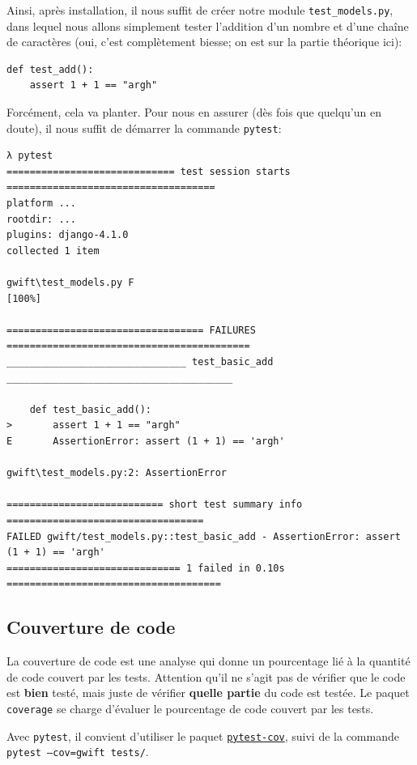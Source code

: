 \documentclass[11pt]{amsbook}
\begin{document}
Ainsi, après installation, il nous suffit de créer notre module \texttt{test\_models.py}, dans lequel nous allons simplement tester l’addition d’un nombre et d’une chaîne de caractères (oui, c’est complètement biesse; on est sur la partie théorique ici):


\begin{verbatim}
def test_add():
    assert 1 + 1 == "argh"
\end{verbatim}

Forcément, cela va planter.
Pour nous en assurer (dès fois que quelqu’un en doute), il nous suffit de démarrer la commande \texttt{pytest}:


\begin{verbatim}
λ pytest
============================= test session starts ====================================
platform ...
rootdir: ...
plugins: django-4.1.0
collected 1 item

gwift\test_models.py F                                                          [100%]

================================== FAILURES ==========================================
_______________________________ test_basic_add _______________________________________

    def test_basic_add():
>       assert 1 + 1 == "argh"
E       AssertionError: assert (1 + 1) == 'argh'

gwift\test_models.py:2: AssertionError

=========================== short test summary info ==================================
FAILED gwift/test_models.py::test_basic_add - AssertionError: assert (1 + 1) == 'argh'
============================== 1 failed in 0.10s =====================================
\end{verbatim}

\hypertarget{x-couverture-de-code}{\subsection{Couverture de code}}
La couverture de code est une analyse qui donne un pourcentage lié à la quantité de code couvert par les tests.
Attention qu’il ne s’agit pas de vérifier que le code est \textbf{bien} testé, mais juste de vérifier \textbf{quelle partie} du code est testée.
Le paquet \texttt{coverage} se charge d’évaluer le pourcentage de code couvert par les tests.


Avec \texttt{pytest}, il convient d’utiliser le paquet \href{https://pypi.org/project/pytest-cov/}{\texttt{pytest-cov}}, suivi de la commande \texttt{pytest --cov=gwift tests/}.
\end{document}
